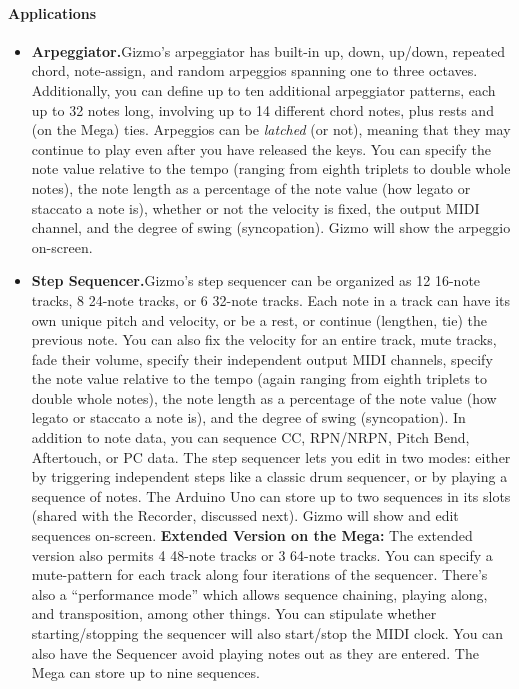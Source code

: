 \documentclass{article}
\begin{document}
\paragraph{Applications}
\begin{itemize}
\item {\bf Arpeggiator.}\quad Gizmo's arpeggiator has built-in up, down, up/down, repeated chord, note-assign, and random arpeggios spanning one to three octaves.  Additionally, you can define up to ten additional arpeggiator patterns, each up to 32 notes long, involving up to 14 different chord notes, plus rests and (on the Mega) ties.  Arpeggios can be {\it latched} (or not), meaning that they may continue to play even after you have released the keys.  You can specify  the note value relative to the tempo (ranging from eighth triplets to double whole notes), the note length as a percentage of the note value (how legato or staccato a note is), whether or not the velocity is fixed, the output MIDI channel, and the degree of swing (syncopation).  Gizmo will show the arpeggio on-screen.

\item {\bf Step Sequencer.}\quad Gizmo's step sequencer can be organized as 12 16-note tracks, 8 24-note tracks, or 6 32-note tracks.  Each note in a track can have its own unique pitch and velocity, or be a rest, or continue (lengthen, tie) the previous note.  You can also fix the velocity for an entire track, mute tracks, fade their volume, specify their independent output MIDI channels, specify the note value relative to the tempo (again ranging from eighth triplets to double whole notes), the note length as a percentage of the note value (how legato or staccato a note is), and the degree of swing (syncopation).   In addition to note data, you can sequence CC, RPN/NRPN, Pitch Bend, Aftertouch, or PC data.  The step sequencer lets you edit in two modes: either by triggering independent steps like a classic drum sequencer, or by playing a sequence of notes.  The Arduino Uno can store up to two sequences in its slots (shared with the Recorder, discussed next).  Gizmo will show and edit sequences on-screen.  {\bf Extended Version on the Mega:} The extended version also permits 4 48-note tracks or 3 64-note tracks.  You can specify a mute-pattern for each track along four iterations of the sequencer.  There's also a ``performance mode'' which allows sequence chaining, playing along, and transposition, among other things.  You can stipulate whether starting/stopping the sequencer will also start/stop the MIDI clock.  You can also have the Sequencer avoid playing notes out as they are entered.  The Mega can store up to nine sequences.


\end{itemize}
\end{document}
